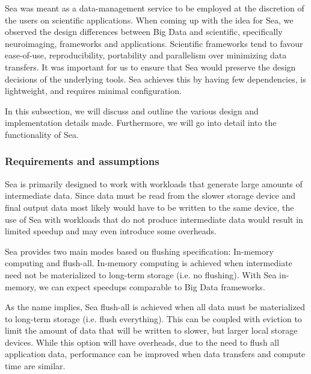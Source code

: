 Sea was meant as a data-management service to be employed at the discretion of
the users on scientific applications. When coming up with the idea for Sea, we
observed the design differences between Big Data and scientific, specifically
neuroimaging, frameworks and applications. Scientific frameworks tend to favour
ease-of-use, reproducibility, portability and parallelism over minimizing data
transfers. It was important for us to ensure that Sea would preserve the design
decisions of the underlying tools. Sea achieves this by having few dependencies,
is lightweight, and requires minimal configuration.


In this subsection, we will discuss and outline the various design and
implementation details made. Furthermore, we will go into detail into the
functionality of Sea.

\subsubsection{Requirements and assumptions}

Sea is primarily designed to work with workloads that generate large amounts of
intermediate data. Since data must be read from the slower storage device and
final output data most likely would have to be written to the same device, the
use of Sea with workloads that do not produce intermediate data would result in
limited speedup and may even introduce some overheads. 

Sea provides two main modes based on flushing specification: In-memory computing
and flush-all. In-memory computing is achieved when intermediate need not be
materialized to long-term storage (i.e. no flushing). With Sea in-memory, we can
expect speedups comparable to Big Data frameworks.

As the name implies, Sea flush-all is achieved when all data must be
materialized to long-term storage (i.e. flush everything). This can be coupled
with eviction to limit the amount of data that will be written to slower, but
larger local storage devices. While this option will have overheads, due to the
need to flush all application data, performance can be improved when data
transfers and compute time are similar. 


